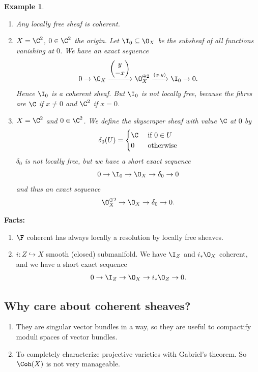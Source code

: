 \documentclass[A4paper, british]{amsart}
\theoremstyle{darkgreentheorem}
\theoremstyle{darkbluedefinition}
\theoremstyle{darkredexample}
\newtheorem{exa}[thm]{Example}
\theoremstyle{remark}
\newcommand{\1}{\mathbbm{1}}
\newcommand{\op}{\oplus}
\newcommand{\sub}{\subseteq}
\newcommand{\mono}{\hookrightarrow}
\begin{document}
\begin{exa}
    \begin{enumerate}
	\item Any locally free sheaf is coherent.
	\item $X=\C^{2}$, $0\in \C^{2}$ the origin.
	    Let $\I_{0}\sub \O_{X}$ be the subsheaf of all functions vanishing at $0$.
	    We have an exact sequence
	    \[ 0\to \O_{X}\xrightarrow{\begin{pmatrix} y \\ -x \end{pmatrix}} \O_{X}^{\op 2}\xrightarrow{(x,y)} \I_{0}\to 0.\]
	    Hence $\I_{0}$ is a coherent sheaf.
	    But $\I_{0}$ is not locally free, because the fibres are $\C$ if $x\neq 0$ and $\C^{2}$ if $x=0$.
	\item $X=\C^{2}$ and $0\in \C^{2}$.
	    We define the skyscraper sheaf with value $\C$ at $0$ by
	    \[ \delta_{0}(U)=
	    \begin{cases}
		\C &\text{ if } 0\in U \\
		0 &\text{ otherwise}
	    \end{cases}
	    \]
	    $\delta_{0}$ is not locally free, but we have a short exact sequence
	    \[ 0\to \I_{0}\to \O_{X}\to \delta_{0}\to 0 \]
	    and thus an exact sequence
	    \[ \O_{X}^{\op 2}\to \O_{X}\to \delta_{0}\to 0.\]
    \end{enumerate}
\end{exa}

\textbf{Facts:}
\begin{enumerate}
    \item $\F$ coherent has always locally a resolution by locally free sheaves.
    \item $i\colon Z\mono X$ smooth (closed) submanifold.
	We have $\I_{Z}$ and $i_{*}\O_{X}$ coherent, and we have a short exact sequence
	\[ 0\to \I_{Z}\to \O_{X}\to i_{*}\O_{Z}\to 0.\]
\end{enumerate}

\subsection{Why care about coherent sheaves?}

\begin{enumerate}
    \item They are singular vector bundles in a way, so they are useful to compactify moduli spaces of vector bundles.
    \item To completely characterize projective varieties with Gabriel's theorem.
	So $\Coh(X)$ is not very manageable.
\end{enumerate}
\end{document}
